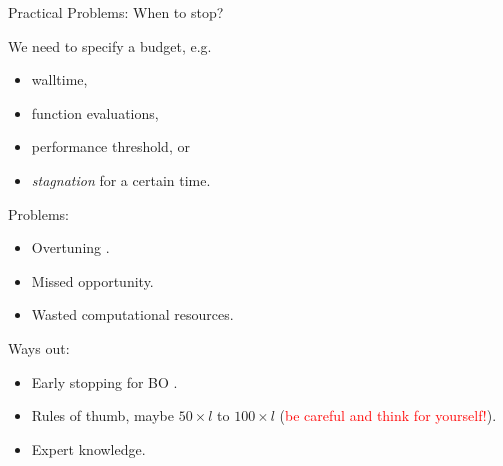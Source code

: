 	\begin{frame}{Practical Problems: When to stop?}

		We need to specify a budget, e.g.
		\begin{itemize}
			\item walltime,
			\item function evaluations,
			\item performance threshold, or
			\item \textit{stagnation} for a certain time.
		\end{itemize}

		Problems:
		\begin{itemize}
			\item Overtuning . 
			\item Missed opportunity. 
			\item Wasted computational resources.
		\end{itemize}


		Ways out:
		\begin{itemize}
			\item Early stopping for BO .
			\item Rules of thumb, maybe $50 \times l$ to $100 \times l$  (\textcolor{red}{be careful and think for yourself!}).
			\item Expert knowledge.
		\end{itemize}

	\end{frame}

